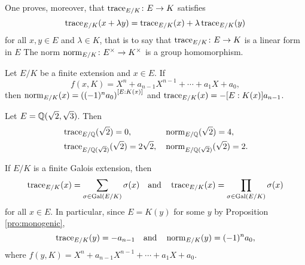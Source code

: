 One proves, moreover, that  
$\operatorname{trace}_{E/K}\colon E\to K$ 
satisfies
\[
\operatorname{trace}_{E/K}(x+\lambda y)=
\operatorname{trace}_{E/K}(x)+\lambda\operatorname{trace}_{E/K}(y)
\]
for all $x,y\in E$ and $\lambda\in K$, that is to say that 
$\operatorname{trace}_{E/K}\colon E\to K$ 
is a 
linear form in $E$ The norm  
$\operatorname{norm}_{E/K}\colon E^{\times}\to K^{\times}$ 
is a group homomorphism. 

\begin{exercise}
        Let $E/K$ be a finite extension and
        $x\in E$. If
        \[
        f(x,K)=X^n+a_{n-1}X^{n-1}+\cdots+a_1X+a_0,
        \]
        then 
        $\operatorname{norm}_{E/K}(x)=\left((-1)^na_0\right)^{[E:K(x)]}$ and 
        $\operatorname{trace}_{E/K}(x)=-[E:K(x)]a_{n-1}$. 
\end{exercise}

\begin{example}
    Let $E=\mathbb{Q}(\sqrt{2},\sqrt{3})$. Then 
    \begin{align*}
    &\operatorname{trace}_{E/\mathbb{Q}}(\sqrt{2})=0,
    &&
    \operatorname{norm}_{E/\mathbb{Q}}(\sqrt{2})=4,\\
    &\operatorname{trace}_{E/\mathbb{Q}(\sqrt{2})}(\sqrt{2})=2\sqrt{2},
    &&\operatorname{norm}_{E/\mathbb{Q}(\sqrt{2})}(\sqrt{2})=2.    
    \end{align*}
\end{example}

\begin{example}
    If $E/K$ is a finite Galois extension, then 
    \[
    \operatorname{trace}_{E/K}(x)=\sum_{\sigma\in\operatorname{Gal}(E/K)}\sigma(x)
    \quad\text{and}\quad
    \operatorname{trace}_{E/K}(x)=\prod_{\sigma\in\operatorname{Gal}(E/K)}\sigma(x)
    \]
    for all $x\in E$. In particular, since $E=K(y)$ for some
    $y$ by Proposition \ref{pro:monogenic}, 
    \[
    \operatorname{trace}_{E/K}(y)=-a_{n-1}
    \quad\text{and}\quad
    \operatorname{norm}_{E/K}(y)=(-1)^na_0,
    \]
    where
    $f(y,K)=X^n+a_{n-1}X^{n-1}+\cdots+a_1X+a_0$.
\end{example}        
